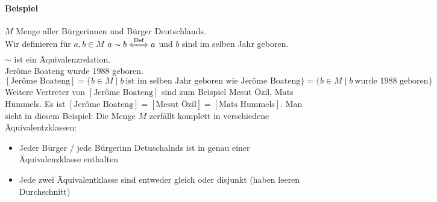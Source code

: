 \documentclass[a4paper]{scrartcl}
\theoremstyle{definition}
\theoremstyle{plain}
\theoremstyle{plain}
\theoremstyle{remark}
\theoremstyle{remark}
\theoremstyle{remark}
\theoremstyle{remark}
\theoremstyle{remark}
\begin{document}
\paragraph{Beispiel}
\label{sec-2-5-6-1}
$M$ Menge aller Bürgerinnen und Bürger Deutschlands. \\
     Wir definieren für $a,b\in M$ $a\sim b \xLeftrightarrow{\text{Def}} a$ und $b$ sind im selben Jahr geboren. \\
     $\sim$ ist ein Äquivalenzrelation. \\
     Jerôme Boateng wurde 1988 geboren. \\
     $[\text{Jerôme Boateng}] = \{b\in M\mid b~\text{ist im selben Jahr geboren wie Jerôme Boateng}\} = \{b\in M\mid b~\text{wurde 1988 geboren}\}$
Weitere Vertreter von $[\text{Jerôme Boateng}]$ sind zum Beispiel Mesut Özil, Mats Hummels.
Es ist $[\text{Jerôme Boateng}] = [\text{Mesut Özil}] = [\text{Mats Hummels}]$.
Man sieht in diesem Beispiel: Die Menge $M$ zerfällt komplett in verschiedene Äquivalentzklassen:
\begin{itemize}
\item Jeder Bürger / jede Bürgerinn Detuschalnds ist in genau einer Äquivalenzklasse enthalten
\item Jede zwei Äquivalentklasse sind entweder gleich oder disjunkt (haben leeren Durchschnitt)
\end{itemize}
\end{document}
